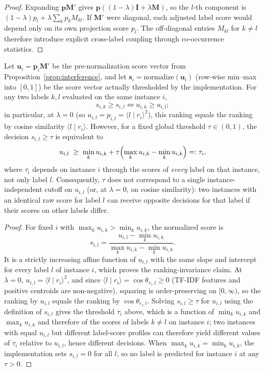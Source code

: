 \documentclass[runningheads]{llncs}
\begin{document}
\begin{proof}
Expanding $\mathbf{p}\mathbf{M}'$ gives
$\mathbf{p}((1-\lambda)\mathbf{I}+\lambda\mathbf{M})$, so the $l$-th component
is $(1-\lambda)p_l+\lambda\sum_k p_kM_{kl}$. If $\mathbf{M}'$ were diagonal,
each adjusted label score would depend only on its own projection score $p_l$.
The off-diagonal entries $M_{kl}$ for $k\neq l$ therefore introduce explicit
cross-label coupling through co-occurrence statistics.
\end{proof}

\begin{proposition}
\label{prop:reduction}
Let $\mathbf{u}_i = \mathbf{p}_i\mathbf{M}'$ be the pre-normalization score
vector from Proposition~\ref{prop:interference}, and let
$\mathbf{s}_i=\mathrm{normalize}(\mathbf{u}_i)$ (row-wise min--max into
$[0,1]$) be the score vector actually thresholded by the implementation. For
any two labels $k,l$ evaluated on the same instance $i$,
$$s_{i,k}\geq s_{i,l} \iff u_{i,k}\geq u_{i,l};$$
in particular, at $\lambda=0$ (so $u_{i,l}=p_{i,l}=\langle l\mid r_i\rangle^2$),
this ranking equals the ranking by cosine similarity
$\langle l\mid r_i\rangle$. However, for a fixed global threshold
$\tau\in(0,1)$, the decision $s_{i,l}\geq\tau$ is equivalent to
$$u_{i,l} \;\geq\; \min_k u_{i,k} + \tau\Bigl(\max_k u_{i,k}-\min_k u_{i,k}\Bigr) =: \tau_i,$$
where $\tau_i$ depends on instance $i$ through the scores of \emph{every}
label on that instance, not only label $l$. Consequently, $\tau$ does not
correspond to a single instance-independent cutoff on $u_{i,l}$ (or, at
$\lambda=0$, on cosine similarity): two instances with an identical raw
score for label $l$ can receive opposite decisions for that label if their
scores on other labels differ.
\end{proposition}

\begin{proof}
For fixed $i$ with $\max_k u_{i,k} > \min_k u_{i,k}$, the normalized score is
\begin{equation}
s_{i,l}=\frac{u_{i,l}-\min_k u_{i,k}}
{\max_k u_{i,k}-\min_k u_{i,k}}.
\end{equation}
It is a strictly increasing affine function of $u_{i,l}$ with the same slope and
intercept for every label $l$ of instance $i$, which proves the
ranking-invariance claim. At $\lambda=0$, $u_{i,l}=\langle l\mid r_i\rangle^2$,
and since $\langle l\mid r_i\rangle=\cos\theta_{r_i,l}\geq 0$ (TF-IDF features
and positive centroids are non-negative), squaring is order-preserving on
$[0,\infty)$, so the ranking by $u_{i,l}$ equals the ranking by
$\cos\theta_{r_i,l}$. Solving $s_{i,l}\geq\tau$ for $u_{i,l}$ using the
definition of $s_{i,l}$ gives the threshold $\tau_i$ above, which is a
function of $\min_k u_{i,k}$ and $\max_k u_{i,k}$ and therefore of the scores
of labels $k\neq l$ on instance $i$; two instances with equal $u_{i,l}$ but
different label-score profiles can therefore yield different values of
$\tau_i$ relative to $u_{i,l}$, hence different decisions. When
$\max_k u_{i,k}=\min_k u_{i,k}$, the implementation sets $s_{i,l}=0$ for all
$l$, so no label is predicted for instance $i$ at any $\tau>0$.
\end{proof}
\end{document}
